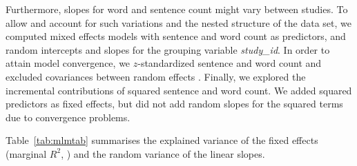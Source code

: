 \documentclass[man,a4paper,mask]{apa6}\usepackage[]{graphicx}\usepackage[]{color}
\begin{document}
Furthermore, slopes for word and sentence count might vary between studies. To allow and account for such variations and the nested structure of the data set, we computed mixed effects models with sentence and word count as predictors, and random intercepts and slopes for the grouping variable \emph{study\_id}. In order to attain model convergence, we $z$-standardized sentence and word count and excluded covariances between random effects \parencite{bates_parsimonious_2015}. Finally, we explored the incremental contributions of squared sentence and word count. We added squared predictors as fixed effects, but did not add random slopes for the squared terms due to convergence problems.

Table~\ref{tab:mlmtab} summarises the explained variance of the fixed effects (marginal $R^2$, ) and the random variance of the linear slopes.
\end{document}
